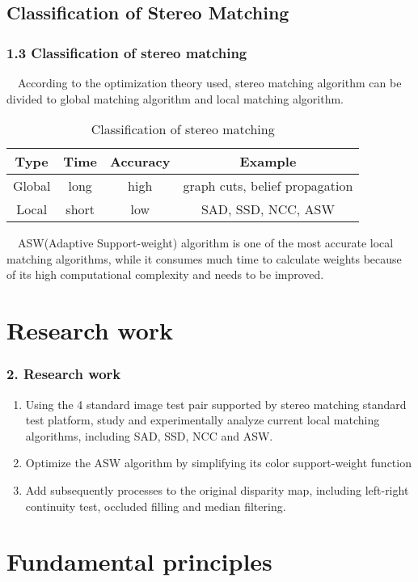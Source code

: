 \documentclass{beamer}
\begin{document}
\subsection{Classification of Stereo Matching}
\begin{frame}
\frametitle{1.3 Classification of stereo matching}
~~According to the optimization theory used, stereo matching algorithm can be divided to global matching algorithm and local matching algorithm.

\begin{table}
\centering
\caption{Classification of stereo matching}
\begin{tabular}{|c|c|c|c|}
\hline
Type & Time & Accuracy & Example\\
\hline
Global & long & high & graph cuts, belief propagation\\
\hline
Local & short & low & SAD, SSD, NCC, ASW\\
\hline
\end{tabular}
\end{table}

~~ASW(Adaptive Support-weight) algorithm is one of the most accurate local matching algorithms, while it consumes much time to calculate weights because of its high computational complexity and needs to be improved.


\end{frame}


\section{Research work}
\begin{frame}
\frametitle{2. Research work}
\begin{enumerate}
\item Using the 4 standard image test pair supported by stereo matching standard test platform, study and experimentally analyze current local matching algorithms, including SAD, SSD, NCC and ASW.

\item Optimize the ASW algorithm by simplifying its color support-weight function 

\item Add subsequently processes to the original disparity map, including left-right continuity test, occluded filling and median filtering.
\end{enumerate}
\end{frame}

\section{Fundamental principles}
\end{document}
